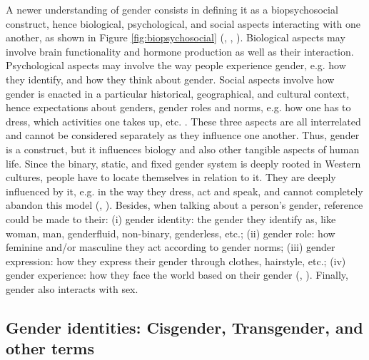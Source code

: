 A newer understanding of gender consists in defining it as a biopsychosocial construct, hence biological, psychological, and social aspects interacting with one another, as shown in Figure \ref{fig:biopsychosocial} (\cite[99f]{barker2018rewriting}, \cite*[35]{barker2018psychology}, \cite[58]{barker2019life}). Biological aspects may involve brain functionality and hormone production as well as their interaction. Psychological aspects may involve the way people experience gender, e.g. how they identify, and how they think about gender. Social aspects involve how gender is enacted in a particular historical, geographical, and cultural context, hence expectations about genders, gender roles and norms, e.g. how one has to dress, which activities one takes up, etc. \citep[58]{barker2019life}. These three aspects are all interrelated and cannot be considered separately as they influence one another. Thus, gender is a construct, but it influences biology and also other tangible aspects of human life. Since the binary, static, and fixed gender system is deeply rooted in Western cultures, people have to locate themselves in relation to it. They are deeply influenced by it, e.g. in the way they dress, act and speak, and cannot completely abandon this model (\cite[81]{barker2019life}, \cite[108f]{acanfora2021in}).
Besides, when talking about a person’s gender, reference could be made to their: (i) gender identity: the gender they identify as, like woman, man, genderfluid, non-binary, genderless, etc.; (ii) gender role: how feminine and/or masculine they act according to gender norms; (iii) gender expression: how they express their gender through clothes, hairstyle, etc.; (iv) gender experience: how they face the world based on their gender (\cite[129]{barker2018rewriting}, \cite[60]{barker2019life}). Finally, gender also interacts with sex. 




\subsection{Gender identities: Cisgender, Transgender, and other terms} \label{identities}


